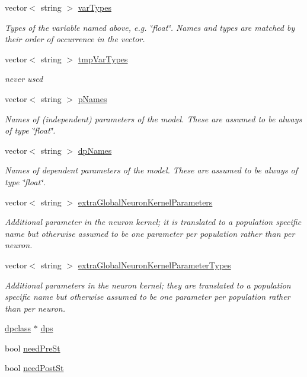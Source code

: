 \begin{DoxyCompactItemize}
vector$<$ string $>$ \hyperlink{structneuronModel_a86788cb29131da0a26ce79693a076352}{var\+Types}
\begin{DoxyCompactList}\small\item\em Types of the variable named above, e.\+g. \char`\"{}float\char`\"{}. Names and types are matched by their order of occurrence in the vector. \end{DoxyCompactList}\item 
vector$<$ string $>$ \hyperlink{structneuronModel_a3f5668e85624014cd5de97bf00d2b82f}{tmp\+Var\+Types}
\begin{DoxyCompactList}\small\item\em never used \end{DoxyCompactList}\item 
vector$<$ string $>$ \hyperlink{structneuronModel_a4a5bf1f757a72b6edc28ad26ed61b2be}{p\+Names}
\begin{DoxyCompactList}\small\item\em Names of (independent) parameters of the model. These are assumed to be always of type \char`\"{}float\char`\"{}. \end{DoxyCompactList}\item 
vector$<$ string $>$ \hyperlink{structneuronModel_a051c0c704ce383c43cdf446accbeb201}{dp\+Names}
\begin{DoxyCompactList}\small\item\em Names of dependent parameters of the model. These are assumed to be always of type \char`\"{}float\char`\"{}. \end{DoxyCompactList}\item 
vector$<$ string $>$ \hyperlink{structneuronModel_a00094db5e89eaa5d8017d83d84c63676}{extra\+Global\+Neuron\+Kernel\+Parameters}
\begin{DoxyCompactList}\small\item\em Additional parameter in the neuron kernel; it is translated to a population specific name but otherwise assumed to be one parameter per population rather than per neuron. \end{DoxyCompactList}\item 
vector$<$ string $>$ \hyperlink{structneuronModel_a35592a2fad7d926ca664871bd1513f24}{extra\+Global\+Neuron\+Kernel\+Parameter\+Types}
\begin{DoxyCompactList}\small\item\em Additional parameters in the neuron kernel; they are translated to a population specific name but otherwise assumed to be one parameter per population rather than per neuron. \end{DoxyCompactList}\item 
\hyperlink{classdpclass}{dpclass} $\ast$ \hyperlink{structneuronModel_a9b9b9e5e66702eb114b268bbd08d7c34}{dps}
\item 
bool \hyperlink{structneuronModel_aff3d8b2160410c976506e0c4ddf8b6c1}{need\+Pre\+St}
\item 
bool \hyperlink{structneuronModel_a633acff33b8b640f7a815f357b144117}{need\+Post\+St}
\end{DoxyCompactItemize}


